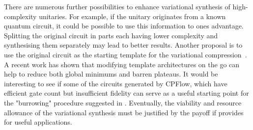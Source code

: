 \documentclass[draft, twocolumn, amsfonts, amssymb, aps, nofootinbib]{revtex4-2}
\begin{document}
There are numerous further possibilities to  enhance variational synthesis of high-complexity unitaries. For example, if the unitary originates from a known quantum circuit, it could be possible to use this information to ones advantage. Splitting the original circuit in parts each having lower complexity and synthesising them separately may lead to better results. Another proposal is to use the original circuit as the starting template for the variational compression~\cite{Rakyta2022}. A recent work \cite{Grimsley2022} has shown that modifying template architectures on the go can help to reduce both global minimums and barren plateaus. It would be interesting to see if some of the circuits generated by CPFlow, which have efficient gate count but insufficient fidelity can serve as a useful starting point for the "burrowing" procedure suggested in \cite{Grimsley2022}. Eventually, the viability and resource allowance of the variational synthesis must be justified by the payoff if provides for useful applications.
\end{document}
